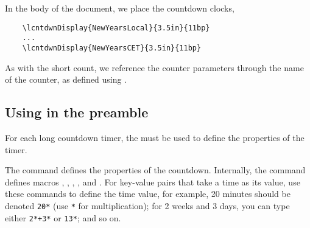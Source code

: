 \documentclass{article}
\begin{document}
In the body of the document, we place the countdown clocks,
\begin{verbatim}
    \lcntdwnDisplay{NewYearsLocal}{3.5in}{11bp}
    ...
    \lcntdwnDisplay{NewYearsCET}{3.5in}{11bp}
\end{verbatim}
As with the short count, we reference the counter parameters through the
name of the counter, as defined using .

\subsection{Using \texorpdfstring{\protect{}}{}
in the preamble}

For each long countdown timer, the  must be used to
define the properties of the timer.
\begin{dCmd*}{.6\linewidth}
\end{dCmd*}
\CmdDescription The command defines the properties of the countdown.
Internally, the command defines macros , ,
, , and . For key-value pairs that take a time as its value, use
these commands to define the time value, for example, 20 minutes should be
denoted \texttt{20*} (use \texttt{*} for multiplication); for
2 weeks and 3 days, you can type either \texttt{2*+\texttt{3*}}
or \texttt{13*}; and so on.
\end{document}
